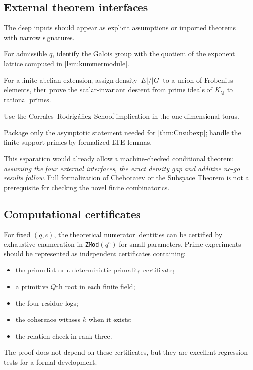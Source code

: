 \documentclass[11pt]{article}
\theoremstyle{definition}
\theoremstyle{remark}
\begin{document}
\subsection{External theorem interfaces}

The deep inputs should appear as explicit assumptions or imported theorems with narrow signatures.
\begin{description}[style=nextline,leftmargin=2em]
\item[Kummer realization]
For admissible $q$, identify the Galois group with the quotient of the exponent lattice computed
in \cref{lem:kummermodule}.
\item[Chebotarev]
For a finite abelian extension, assign density $|E|/|G|$ to a union of Frobenius elements, then
prove the scalar-invariant descent from prime ideals of $K_Q$ to rational primes.
\item[Support theorem]
Use the Corrales--Rodrig\'a\~nez--Schoof implication in the one-dimensional torus.
\item[$S$-unit gcd]
Package only the asymptotic statement needed for \cref{thm:Cnsubexp}; handle the finite support
primes by formalized LTE lemmas.
\end{description}

This separation would already allow a machine-checked conditional theorem:
\emph{assuming the four external interfaces, the exact density gap and additive no-go results
follow}.  Full formalization of Chebotarev or the Subspace Theorem is not a prerequisite for
checking the novel finite combinatorics.

\subsection{Computational certificates}

For fixed $(q,e)$, the theoretical numerator identities can be certified by exhaustive
enumeration in \texttt{ZMod}$(q^e)$ for small parameters.  Prime experiments should be represented as
independent certificates containing:
\begin{itemize}[leftmargin=2em,itemsep=1pt]
\item the prime list or a deterministic primality certificate;
\item a primitive $Q$th root in each finite field;
\item the four residue logs;
\item the coherence witness $k$ when it exists;
\item the relation check in rank three.
\end{itemize}
The proof does not depend on these certificates, but they are excellent regression tests for a
formal development.
\end{document}
